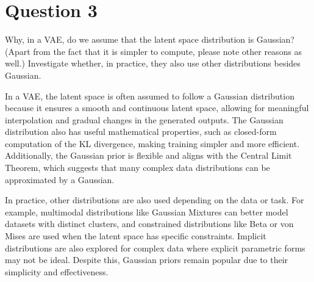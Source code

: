 \section{Question 3}

Why, in a VAE, do we assume that the latent space distribution is Gaussian? 
(Apart from the fact that it is simpler to compute, please note other reasons as well.)
Investigate whether, in practice, they also use other distributions besides Gaussian.

\begin{qsolve}
    \begin{qsolve}[]
      In a VAE, the latent space is often assumed to follow a Gaussian distribution because it ensures a smooth and continuous latent space, allowing for meaningful interpolation and gradual changes in the generated outputs. The Gaussian distribution also has useful mathematical properties, such as closed-form computation of the KL divergence, making training simpler and more efficient. Additionally, the Gaussian prior is flexible and aligns with the Central Limit Theorem, which suggests that many complex data distributions can be approximated by a Gaussian.

      In practice, other distributions are also used depending on the data or task. For example, multimodal distributions like Gaussian Mixtures can better model datasets with distinct clusters, and constrained distributions like Beta or von Mises are used when the latent space has specific constraints. Implicit distributions are also explored for complex data where explicit parametric forms may not be ideal. Despite this, Gaussian priors remain popular due to their simplicity and effectiveness.
    \end{qsolve}
\end{qsolve}
